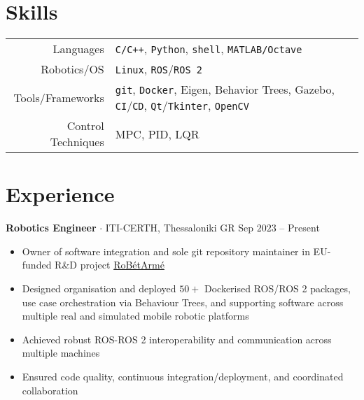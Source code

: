 \documentclass[a4paper,10pt,twoside]{article}
\newcommand{\verticalspacebetweensections}{\vspace{0em}}
\newcommand{\verticalspacebetweensectionandcontent}{\vspace{0.4em}}
\newcommand{\verticalspaceafteritem}{\vspace{-0.8em}}
\begin{document}
\section{\textbf{Skills}}\verticalspacebetweensectionandcontent

\begin{center}
\begin{tabular}{rl}
Languages & \texttt{C/C++}, \texttt{Python}, \texttt{shell}, \texttt{MATLAB/Octave} \\
Robotics/OS & \texttt{Linux},  \texttt{ROS}/\texttt{ROS 2} \\
Tools/Frameworks & \texttt{git}, \texttt{Docker}, Eigen, Behavior Trees, Gazebo, \texttt{CI}/\texttt{CD}, \texttt{Qt}/\texttt{Tkinter}, \texttt{OpenCV} \\
Control Techniques & MPC, PID, LQR
\end{tabular}
\end{center}
\verticalspacebetweensections

\section{\textbf{Experience}}\verticalspacebetweensectionandcontent

  \noindent\textbf{Robotics Engineer} $\cdot$ ITI-CERTH, Thessaloniki GR \hfill {\small \textcolor{datecolour}{Sep $2023$ -- Present}} \\
  \begin{minipage}[t]{\textwidth}
    \begin{itemize}
      \item Owner of software integration and sole git repository maintainer in EU-funded R\&D project \href{https://www.robetarme-project.eu/}{RoBétArmé}\verticalspaceafteritem
      \item Designed organisation and deployed $50+$ Dockerised ROS/ROS 2 packages, use case orchestration via Behaviour Trees, and supporting software across multiple real and simulated mobile robotic platforms \verticalspaceafteritem
      \item Achieved robust ROS-ROS 2 interoperability and communication across multiple machines\verticalspaceafteritem
      \item Ensured code quality, continuous integration/deployment, and coordinated collaboration
    \end{itemize}
  \end{minipage} \\[0.2em]
\end{document}
